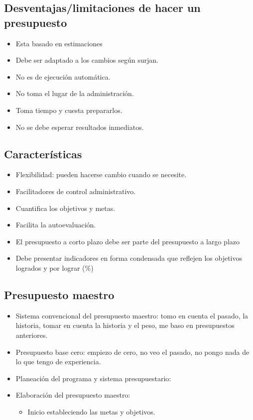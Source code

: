 \subsection{Desventajas/limitaciones de hacer un presupuesto}
\begin{itemize}
    \item Esta basado en estimaciones 
    \item Debe ser adaptado a los cambios según surjan.
    \item No es de ejecución automática.
    \item No toma el lugar de la administración.
    \item Toma tiempo y cuesta prepararlos.
    \item No se debe esperar resultados inmediatos.
\end{itemize}


\subsection{Características}
\begin{itemize}
    \item Flexibilidad: pueden hacerse cambio cuando se necesite.
    \item Facilitadores de control administrativo.
    \item Cuantifica los objetivos y metas.
    \item Facilita la autoevaluación.
    \item El presupuesto a corto plazo debe ser parte del presupuesto a largo plazo 
    \item Debe presentar indicadores en forma condensada que reflejen los objetivos logrados y por lograr (\%)
\end{itemize}


\subsection{Presupuesto maestro}
\begin{itemize}
    \item Sistema convencional del presupuesto maestro: tomo en cuenta el pasado, la historia, tomar en cuenta la historia y el peso, me baso en presupuestos anteriores.
    \item Presupuesto base cero: empiezo de cero, no veo el pasado, no pongo nada de lo que tengo de experiencia.
    \item Planeación del programa y sistema presupuestario: 
    \item Elaboración del presupuesto maestro: 
        \begin{itemize}
            \item Inicio estableciendo las metas y objetivos.
        \end{itemize}
\end{itemize}



